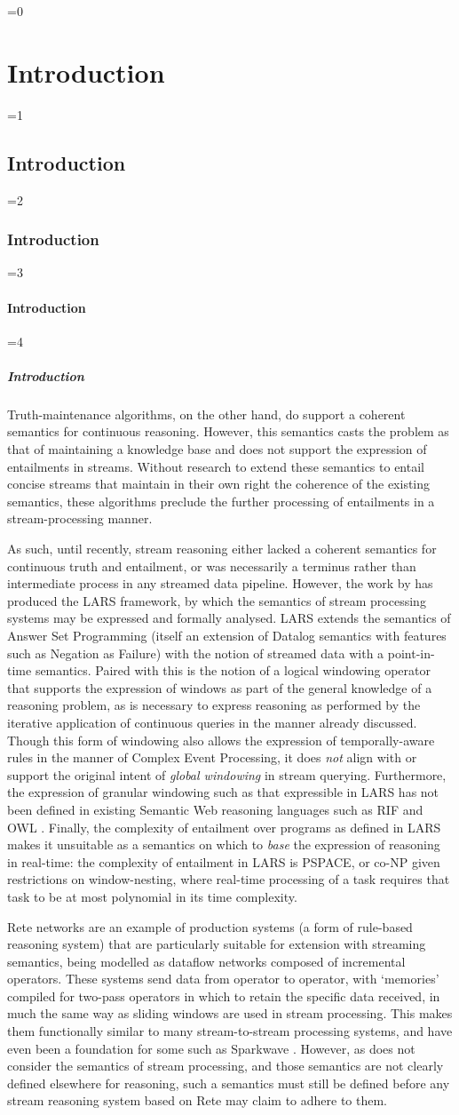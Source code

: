 \documentclass[twocolumn,preprint,3p,number]{elsarticle}
\theoremstyle{plain}
\theoremstyle{definition}
\newcounter{nestingdepth}
\newenvironment{nestedsection}[2]{
  \ifnum\value{nestingdepth}=0
    \chapter{#1}
  \else
    \ifnum\value{nestingdepth}=1
      \section{#1}
    \else
      \ifnum\value{nestingdepth}=2
        \subsection{#1}
      \else
        \ifnum\value{nestingdepth}=3
          \subsubsection{#1}
        \else
          \ifnum\value{nestingdepth}=4
            \paragraph{#1}
          \else
            \PackageError{nestedsections}{Maximum nesting level exceeded!}{uh oh!}
          \fi
        \fi
      \fi
    \fi
  \fi
  \addtocounter{nestingdepth}{1}
  \label{sec:#2}
}{\addtocounter{nestingdepth}{-1}}
\begin{document}
\begin{nestedsection}{Introduction}{intro}
  Truth-maintenance algorithms, on the other hand, do support a coherent semantics for continuous reasoning.
  However, this semantics casts the problem as that of maintaining a knowledge base and does not support the expression of entailments in streams.
  Without research to extend these semantics to entail concise streams that maintain in their own right the coherence of the existing semantics, these algorithms preclude the further processing of entailments in a stream-processing manner.

  As such, until recently, stream reasoning either lacked a coherent semantics for continuous truth and entailment, or was necessarily a terminus rather than intermediate process in any streamed data pipeline.
  However, the work by \citet{LARS} has produced the LARS framework, by which the semantics of stream processing systems may be expressed and formally analysed.
  LARS extends the semantics of Answer Set Programming (itself an extension of Datalog semantics with features such as Negation as Failure) with the notion of streamed data with a point-in-time semantics.
  Paired with this is the notion of a logical windowing operator that supports the expression of windows as part of the general knowledge of a reasoning problem, as is necessary to express reasoning as performed by the iterative application of continuous queries in the manner already discussed.
  Though this form of windowing also allows the expression of temporally-aware rules in the manner of Complex Event Processing, it does \emph{not} align with or support the original intent of \emph{global windowing} in stream querying.
  Furthermore, the expression of granular windowing such as that expressible in LARS has not been defined in existing Semantic Web reasoning languages such as RIF \citep{w3crif} and OWL \citep{w3cowl2}.
  Finally, the complexity of entailment over programs as defined in LARS makes it unsuitable as a semantics on which to \emph{base} the expression of reasoning in real-time:
  the complexity of entailment in LARS is PSPACE, or co-NP given restrictions on window-nesting, where real-time processing of a task requires that task to be at most polynomial in its time complexity.
  
  Rete networks \citep{forgy79} are an example of production systems (a form of rule-based reasoning system) that are particularly suitable for extension with streaming semantics, being modelled as dataflow networks composed of incremental operators.
  These systems send data from operator to operator, with `memories' compiled for two-pass operators in which to retain the specific data received, in much the same way as sliding windows are used in stream processing.
  This makes them functionally similar to many stream-to-stream processing systems, and have even been a foundation for some such as Sparkwave \citep{sparkwave}.
  However, as \citep{forgy79} does not consider the semantics of stream processing, and those semantics are not clearly defined elsewhere for reasoning, such a semantics must still be defined before any stream reasoning system based on Rete may claim to adhere to them.


\end{nestedsection}
\end{document}
